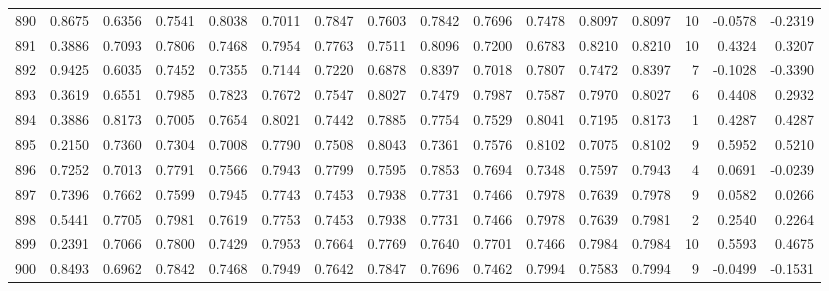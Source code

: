 \begin{tabular}{lrrrrrrrrrrrrrrr}
890 &      0.8675 &  0.6356 &  0.7541 &  0.8038 &  0.7011 &  0.7847 &  0.7603 &  0.7842 &  0.7696 &  0.7478 &   0.8097 &     0.8097 &     10 &                   -0.0578 &                    -0.2319 \\
891 &      0.3886 &  0.7093 &  0.7806 &  0.7468 &  0.7954 &  0.7763 &  0.7511 &  0.8096 &  0.7200 &  0.6783 &   0.8210 &     0.8210 &     10 &                    0.4324 &                     0.3207 \\
892 &      0.9425 &  0.6035 &  0.7452 &  0.7355 &  0.7144 &  0.7220 &  0.6878 &  0.8397 &  0.7018 &  0.7807 &   0.7472 &     0.8397 &      7 &                   -0.1028 &                    -0.3390 \\
893 &      0.3619 &  0.6551 &  0.7985 &  0.7823 &  0.7672 &  0.7547 &  0.8027 &  0.7479 &  0.7987 &  0.7587 &   0.7970 &     0.8027 &      6 &                    0.4408 &                     0.2932 \\
894 &      0.3886 &  0.8173 &  0.7005 &  0.7654 &  0.8021 &  0.7442 &  0.7885 &  0.7754 &  0.7529 &  0.8041 &   0.7195 &     0.8173 &      1 &                    0.4287 &                     0.4287 \\
895 &      0.2150 &  0.7360 &  0.7304 &  0.7008 &  0.7790 &  0.7508 &  0.8043 &  0.7361 &  0.7576 &  0.8102 &   0.7075 &     0.8102 &      9 &                    0.5952 &                     0.5210 \\
896 &      0.7252 &  0.7013 &  0.7791 &  0.7566 &  0.7943 &  0.7799 &  0.7595 &  0.7853 &  0.7694 &  0.7348 &   0.7597 &     0.7943 &      4 &                    0.0691 &                    -0.0239 \\
897 &      0.7396 &  0.7662 &  0.7599 &  0.7945 &  0.7743 &  0.7453 &  0.7938 &  0.7731 &  0.7466 &  0.7978 &   0.7639 &     0.7978 &      9 &                    0.0582 &                     0.0266 \\
898 &      0.5441 &  0.7705 &  0.7981 &  0.7619 &  0.7753 &  0.7453 &  0.7938 &  0.7731 &  0.7466 &  0.7978 &   0.7639 &     0.7981 &      2 &                    0.2540 &                     0.2264 \\
899 &      0.2391 &  0.7066 &  0.7800 &  0.7429 &  0.7953 &  0.7664 &  0.7769 &  0.7640 &  0.7701 &  0.7466 &   0.7984 &     0.7984 &     10 &                    0.5593 &                     0.4675 \\
900 &      0.8493 &  0.6962 &  0.7842 &  0.7468 &  0.7949 &  0.7642 &  0.7847 &  0.7696 &  0.7462 &  0.7994 &   0.7583 &     0.7994 &      9 &                   -0.0499 &                    -0.1531 \\

\end{tabular}

